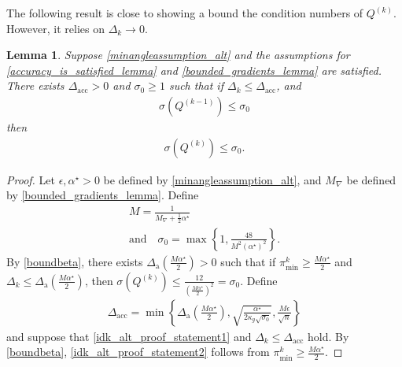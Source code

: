 \documentclass{article}
\newtheorem{lemma}[theorem]{Lemma}
\theoremstyle{case}
\numberwithin{theorem}{subsection}
\newcommand{\dacc}{{\Delta_{\textrm{acc}}}}
\newcommand{\dacco}{{\Delta_{\textrm{a}}}}
\newcommand{\dk}{\Delta_k}
\newcommand{\gradf}{\nabla f}
\newcommand{\maxgrad}{{M_{\nabla}}}
\newcommand{\mfk}{{{m}_f}^{(k)}}
\newcommand{\minanglealpha}{{ \alpha^{\star} }}
\newcommand{\qk}{{Q^{(k)}}}
\newcommand{\Rn}{\mathbb R^n}
\newcommand{\thetamink}{{\pi^k_{\textrm{min}}}}
\newcommand{\tr}{{ B_{\infty}\left(\xk, \dk\right) }}
\newcommand{\xk}{x^{(k)}}
\newcommand{\epsactive}{{\mathbb A_c}}
\begin{document}
The following result is close to showing a bound the condition numbers of $\qk$.
However, it relies on $\dk \to 0$.
\begin{lemma}
Suppose \cref{minangleassumption_alt}
and the assumptions for \cref{accuracy_is_satisfied_lemma} and \cref{bounded_gradients_lemma} are satisfied.
There exists $\dacc > 0$ and $\sigma_0 \ge 1$ such that if $\dk \le \dacc$, and
\begin{align}
\sigma\left( Q^{(k-1)} \right) \le \sigma_0 \label{idk_alt_proof_statement1}
\end{align}
then 
\begin{align}
\sigma\left( \qk \right) \le \sigma_0. \label{idk_alt_proof_statement2}
\end{align}
\end{lemma}


\begin{proof}
Let $\epsilon, \minanglealpha > 0$ be defined by \cref{minangleassumption_alt}, and $\maxgrad$ be defined by \cref{bounded_gradients_lemma}.
Define
\begin{align}
&M = \frac 1 {\maxgrad + \frac 1 2 \minanglealpha} & \\
&\textrm{and} \quad \sigma_0 = \max\left\{1, \frac{48}{M^2\left(\minanglealpha\right)^2}\right\}.&
\end{align}
By \cref{boundbeta}, there exists $\dacco \left(\frac {M \minanglealpha} 2\right) > 0$ such that if
$\thetamink \ge \frac {M \minanglealpha} 2$ and $\dk \le \dacco \left(\frac {M \minanglealpha} 2\right)$,
then $\sigma\left(\qk\right) \le \frac{12}{\left(\frac{M\minanglealpha}{2}\right)^2} = \sigma_0$.
Define 
\begin{align}
\dacc = \min\left\{
\dacco \left(\frac {M \minanglealpha} 2\right), 
\sqrt{\frac {\minanglealpha}{2\kappa_g\sqrt{\sigma_0}}},
\frac{M \epsilon}{\sqrt{n}}
\right\} \label{define_delta_accuracy2}
\end{align}
and suppose that \cref{idk_alt_proof_statement1} and $\dk \le \dacc$ hold.
By \cref{boundbeta}, \cref{idk_alt_proof_statement2} follows from $\thetamink \ge \frac {M \minanglealpha} 2$.



\end{proof}
\end{document}
